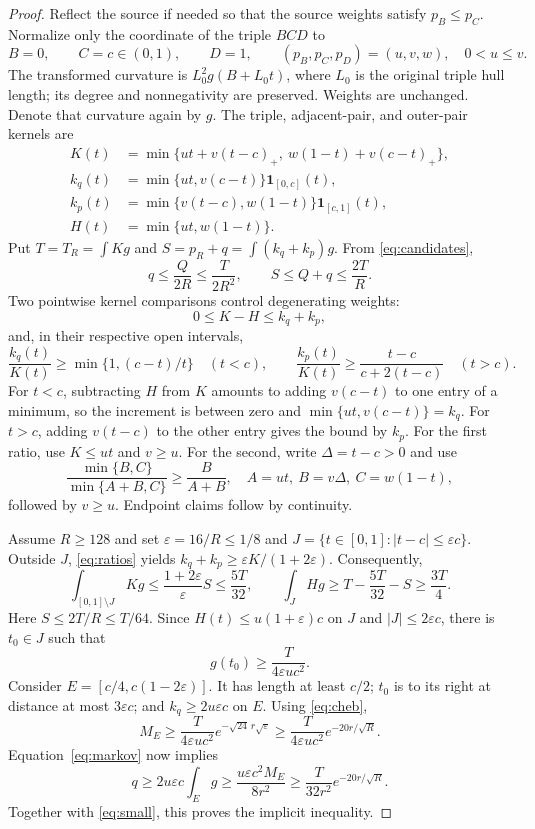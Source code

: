 \begin{proof}
Reflect the source if needed so that the source weights satisfy
$p_B\le p_C$. Normalize only the coordinate of the triple $BCD$ to
\[
 B=0,\qquad C=c\in(0,1),\qquad D=1,
 \qquad (p_B,p_C,p_D)=(u,v,w),\quad 0<u\le v.
\]
The transformed curvature is $L_0^2g(B+L_0t)$, where $L_0$ is the
original triple hull length; its degree and nonnegativity are preserved.
Weights are unchanged. Denote that curvature again by $g$. The triple,
adjacent-pair, and outer-pair kernels are
\begin{align*}
 K(t)&=\min\{ut+v(t-c)_+,\ w(1-t)+v(c-t)_+\},\\
 k_q(t)&=\min\{ut,v(c-t)\}\mathbf1_{[0,c]}(t),\\
 k_p(t)&=\min\{v(t-c),w(1-t)\}\mathbf1_{[c,1]}(t),\\
 H(t)&=\min\{ut,w(1-t)\}.
\end{align*}
Put $T=T_R=\int Kg$ and $S=p_R+q=\int(k_q+k_p)g$. From
\eqref{eq:candidates},
\begin{equation}
 q\le\frac{Q}{2R}\le\frac{T}{2R^2},\qquad
 S\le Q+q\le\frac{2T}{R}.
 \label{eq:small}
\end{equation}
Two pointwise kernel comparisons control degenerating weights:
\begin{equation}
 0\le K-H\le k_q+k_p,
 \label{eq:H}
\end{equation}
and, in their respective open intervals,
\begin{equation}
 \frac{k_q(t)}{K(t)}\ge\min\{1,(c-t)/t\}\quad(t<c),
 \qquad
 \frac{k_p(t)}{K(t)}\ge\frac{t-c}{c+2(t-c)}\quad(t>c).
 \label{eq:ratios}
\end{equation}
For $t<c$, subtracting $H$ from $K$ amounts to adding $v(c-t)$ to one
entry of a minimum, so the increment is between zero and
$\min\{ut,v(c-t)\}=k_q$. For $t>c$, adding $v(t-c)$ to the other entry
gives the bound by $k_p$. For the first ratio, use $K\le ut$ and
$v\ge u$. For the second, write $\Delta=t-c>0$ and use
\[
 \frac{\min\{B,C\}}{\min\{A+B,C\}}\ge\frac{B}{A+B},
 \quad A=ut,\ B=v\Delta,\ C=w(1-t),
\]
followed by $v\ge u$. Endpoint claims follow by continuity.

Assume $R\ge128$ and set
$\varepsilon=16/R\le1/8$ and
$J=\{t\in[0,1]:|t-c|\le\varepsilon c\}$. Outside $J$,
\eqref{eq:ratios} yields
$k_q+k_p\ge\varepsilon K/(1+2\varepsilon)$. Consequently,
\[
 \int_{[0,1]\setminus J}Kg
 \le\frac{1+2\varepsilon}{\varepsilon}S
 \le\frac{5T}{32},\qquad
 \int_JHg\ge T-\frac{5T}{32}-S\ge\frac{3T}{4}.
\]
Here $S\le2T/R\le T/64$. Since
$H(t)\le u(1+\varepsilon)c$ on $J$ and $|J|\le2\varepsilon c$,
there is $t_0\in J$ such that
\[
 g(t_0)\ge\frac{T}{4\varepsilon u c^2}.
\]
Consider $E=[c/4,c(1-2\varepsilon)]$. It has length at least $c/2$;
$t_0$ is to its right at distance at most $3\varepsilon c$; and
$k_q\ge2u\varepsilon c$ on $E$. Using \eqref{eq:cheb},
\[
 M_E\ge\frac{T}{4\varepsilon u c^2}
 e^{-\sqrt{24}\,r\sqrt\varepsilon}
 \ge\frac{T}{4\varepsilon u c^2}e^{-20r/\sqrt R}.
\]
Equation~\eqref{eq:markov} now implies
\[
 q\ge2u\varepsilon c\int_Eg
 \ge\frac{u\varepsilon c^2M_E}{8r^2}
 \ge\frac{T}{32r^2}e^{-20r/\sqrt R}.
\]
Together with \eqref{eq:small}, this proves the implicit inequality.


\end{proof}
